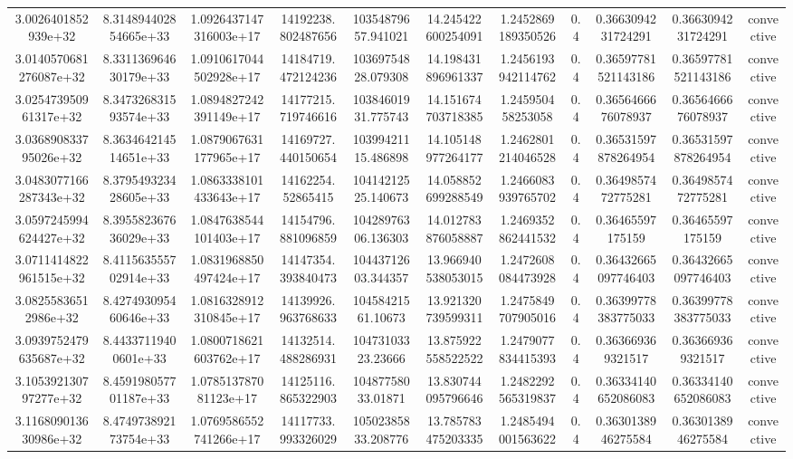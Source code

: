 \begin{table}
\begin{tabular}{ccccccccccc}
3.0026401852939e+32 & 8.314894402854665e+33 & 1.0926437147316003e+17 & 14192238.802487656 & 10354879657.941021 & 14.245422600254091 & 1.2452869189350526 & 0.4 & 0.3663094231724291 & 0.3663094231724291 & convective \\
3.0140570681276087e+32 & 8.331136964630179e+33 & 1.0910617044502928e+17 & 14184719.472124236 & 10369754828.079308 & 14.198431896961337 & 1.2456193942114762 & 0.4 & 0.36597781521143186 & 0.36597781521143186 & convective \\
3.025473950961317e+32 & 8.347326831593574e+33 & 1.0894827242391149e+17 & 14177215.719746616 & 10384601931.775743 & 14.151674703718385 & 1.245950458253058 & 0.4 & 0.3656466676078937 & 0.3656466676078937 & convective \\
3.036890833795026e+32 & 8.363464214514651e+33 & 1.0879067631177965e+17 & 14169727.440150654 & 10399421115.486898 & 14.105148977264177 & 1.2462801214046528 & 0.4 & 0.36531597878264954 & 0.36531597878264954 & convective \\
3.0483077166287343e+32 & 8.379549323428605e+33 & 1.0863338101433643e+17 & 14162254.52865415 & 10414212525.140673 & 14.058852699288549 & 1.2466083939765702 & 0.4 & 0.3649857472775281 & 0.3649857472775281 & convective \\
3.0597245994624427e+32 & 8.395582367636029e+33 & 1.0847638544101403e+17 & 14154796.881096859 & 10428976306.136303 & 14.012783876058887 & 1.2469352862441532 & 0.4 & 0.36465597175159 & 0.36465597175159 & convective \\
3.0711414822961515e+32 & 8.411563555702914e+33 & 1.0831968850497424e+17 & 14147354.393840473 & 10443712603.344357 & 13.966940538053015 & 1.2472608084473928 & 0.4 & 0.36432665097746403 & 0.36432665097746403 & convective \\
3.08255836512986e+32 & 8.427493095460646e+33 & 1.0816328912310845e+17 & 14139926.963768633 & 10458421561.10673 & 13.921320739599311 & 1.2475849707905016 & 0.4 & 0.36399778383775033 & 0.36399778383775033 & convective \\
3.0939752479635687e+32 & 8.44337119400601e+33 & 1.0800718621603762e+17 & 14132514.488286931 & 10473103323.23666 & 13.875922558522522 & 1.2479077834415393 & 0.4 & 0.363669369321517 & 0.363669369321517 & convective \\
3.105392130797277e+32 & 8.459198057701187e+33 & 1.078513787081123e+17 & 14125116.865322903 & 10487758033.01871 & 13.830744095796646 & 1.2482292565319837 & 0.4 & 0.36334140652086083 & 0.36334140652086083 & convective \\
3.116809013630986e+32 & 8.474973892173754e+33 & 1.0769586552741266e+17 & 14117733.993326029 & 10502385833.208776 & 13.785783475203335 & 1.2485494001563622 & 0.4 & 0.3630138946275584 & 0.3630138946275584 & convective \\

\end{tabular}
\end{table}
